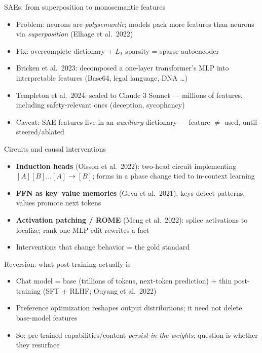 \documentclass[aspectratio=169,11pt]{beamer}
\begin{document}
\begin{frame}{SAEs: from superposition to monosemantic features}
\begin{itemize}
\item Problem: neurons are \emph{polysemantic}; models pack more features than neurons via \emph{superposition} (Elhage et al.\ 2022)
\item Fix: overcomplete dictionary + $L_1$ sparsity = sparse autoencoder
\item Bricken et al.\ 2023: decomposed a one-layer transformer's MLP into interpretable features (Base64, legal language, DNA \dots)
\item Templeton et al.\ 2024: scaled to Claude 3 Sonnet --- millions of features, including safety-relevant ones (deception, sycophancy)
\item Caveat: SAE features live in an \emph{auxiliary} dictionary --- feature $\neq$ used, until steered/ablated
\end{itemize}
\end{frame}

\begin{frame}{Circuits and causal interventions}
\begin{itemize}
\item \textbf{Induction heads} (Olsson et al.\ 2022): two-head circuit implementing $[A][B]\ldots[A]\!\rightarrow\![B]$; forms in a phase change tied to in-context learning
\item \textbf{FFN as key--value memories} (Geva et al.\ 2021): keys detect patterns, values promote next tokens
\item \textbf{Activation patching / ROME} (Meng et al.\ 2022): splice activations to localize; rank-one MLP edit rewrites a fact
\item Interventions that change behavior = the gold standard
\end{itemize}
\end{frame}

\begin{frame}{Reversion: what post-training actually is}
\begin{itemize}
\item Chat model = base (trillions of tokens, next-token prediction) + thin post-training (SFT + RLHF; Ouyang et al.\ 2022)
\item Preference optimization reshapes output distributions; it need not delete base-model features
\item So: pre-trained capabilities/content \emph{persist in the weights}; question is whether they resurface
\end{itemize}
\end{frame}
\end{document}
